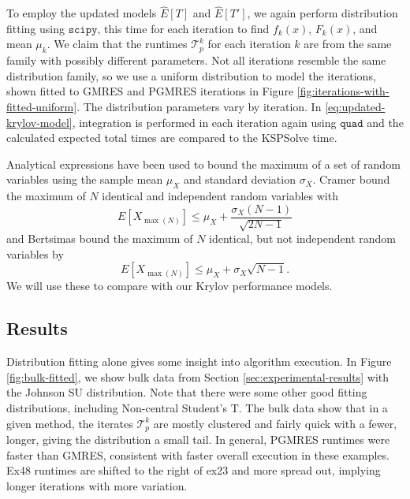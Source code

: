 \documentclass[sigconf, anonymous]{acmart}
\begin{document}
To employ the updated models $\widehat{E}[T]$ and $\widehat{E}[T']$, we again perform distribution fitting using ${\texttt{scipy}}$, this time for each iteration to find  $f_k(x)$, $F_k(x)$, and mean $\mu_k$.
We claim that the runtimes $\mathcal{T}^k_p$ for each iteration $k$ are from the same family with possibly different parameters. 
Not all iterations resemble the same distribution family, so we use a uniform distribution to model the iterations, shown fitted to GMRES and PGMRES iterations in Figure \ref{fig:iterations-with-fitted-uniform}. 
The distribution parameters vary by iteration.
In \eqref{eq:updated-krylov-model}, integration is performed in each iteration again using ${\texttt{quad}}$ and the calculated expected total times are compared to the KSPSolve time.

Analytical expressions have been used \cite{seelam2010extreme} to bound the maximum of a set of random variables using the sample mean $\mu_X$ and standard deviation $\sigma_X$.  Cramer \cite{cramer2016mathematical, david2004order} bound the maximum of $N$ identical and independent random variables  with
\begin{equation}
E[X_{\max{(N)}}] \leq \mu_X + \frac{\sigma_X (N-1)}{\sqrt{2N-1}}
\end{equation}
and Bertsimas \cite{bertsimas2006tight} bound the maximum of $N$ identical, but not independent random variables by
\begin{equation}
E[X_{\max{(N)}}] \leq \mu_X + \sigma_X \sqrt{N-1}.
\end{equation}
We will use these to compare with our Krylov performance models.

\subsection{Results}

Distribution fitting alone gives some insight into algorithm execution. 
In Figure \ref{fig:bulk-fitted}, we show bulk data from Section \ref{sec:experimental-results} with the Johnson SU distribution. Note that there were some other good fitting distributions, including Non-central Student's T.
The bulk data show that in a given method, the iterates $\mathcal{T}^k_p$ are mostly clustered and fairly quick with a fewer, longer, giving the distribution a small tail.
In general, PGMRES runtimes were faster than GMRES, consistent with faster overall execution in these examples. Ex48 runtimes are shifted to the right of ex23 and more spread out, implying longer iterations with more variation. 
\end{document}
